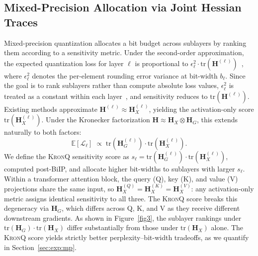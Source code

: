 \documentclass{article} %
\newcommand{\KronQ}{\textsc{KronQ}}
\newcommand{\yh}[1]{\textcolor{blue}{#1}}
\begin{document}
\subsection{Mixed-Precision Allocation via Joint Hessian Traces}
\label{sec:method:mp}
\vspace{-2mm}
Mixed-precision quantization allocates a bit budget across sublayers by ranking them according to a sensitivity metric. Under the second-order approximation, the expected quantization loss for layer $\ell$ is proportional to $\epsilon_\ell^2 \cdot \mathrm{tr}(\mathbf{H}^{(\ell)})$~\citep{dong2020hawq}, where $\epsilon_\ell^2$ denotes the per-element rounding error variance at bit-width $b_\ell$. Since the goal is to rank sublayers rather than compute absolute loss values, $\epsilon_\ell^2$ is treated as a constant within each layer~\citep{dong2020hawq}, and sensitivity reduces to $\mathrm{tr}(\mathbf{H}^{(\ell)})$. Existing methods approximate $\mathbf{H}^{(\ell)} \approx \mathbf{H}_X^{(\ell)}$, yielding the activation-only score $\mathrm{tr}(\mathbf{H}_X^{(\ell)})$. Under the Kronecker factorization $\mathbf{H} \approx \mathbf{H}_X \otimes \mathbf{H}_G$, this extends naturally to both factors:
\begin{equation}
    \mathbb{E}[\mathcal{L}_\ell] \;\propto\;
    \mathrm{tr}(\mathbf{H}_G^{(\ell)}) \cdot \mathrm{tr}(\mathbf{H}_X^{(\ell)}).
    \label{eq:sensitivity}
\end{equation}
We define the \KronQ{} sensitivity score as $s_\ell = \mathrm{tr}(\mathbf{H}_G^{(\ell)}) \cdot \mathrm{tr}(\mathbf{H}_X^{(\ell)})$, computed post-BiIP, and allocate higher bit-widths to sublayers with larger $s_\ell$. Within a transformer attention block, the query (Q), key (K), and value (V) projections share the same input, so $\mathbf{H}_X^{(Q)} = \mathbf{H}_X^{(K)} = \mathbf{H}_X^{(V)}$: any activation-only metric assigns identical sensitivity to all three. The \KronQ{} score breaks this degeneracy via $\mathbf{H}_G$, which differs across Q, K, and V as they receive different downstream gradients. As shown in Figure~\ref{fig3}, the sublayer rankings under $\mathrm{tr}(\mathbf{H}_G)\cdot\mathrm{tr}(\mathbf{H}_X)$ differ substantially from those under $\mathrm{tr}(\mathbf{H}_X)$ alone. The \KronQ{} score yields strictly better perplexity--bit-width tradeoffs, as we quantify in Section~\ref{sec:exp:mp}.


\end{document}
